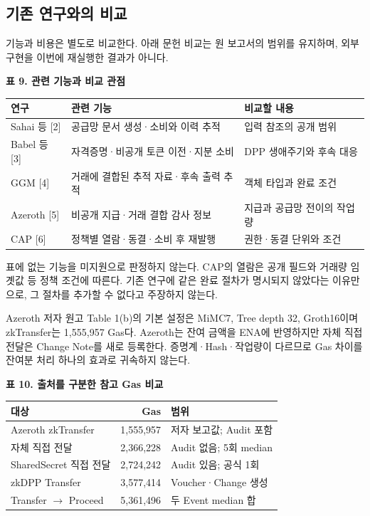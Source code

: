 \subsection{기존 연구와의 비교}
기능과 비용은 별도로 비교한다. 아래 문헌 비교는 원 보고서의 범위를 유지하며, 외부 구현을 이번에 재실행한 결과가 아니다.
\begin{center}\small\setlength{\tabcolsep}{6pt}
    \textbf{표 9. 관련 기능과 비교 관점}\par\smallskip
    \begin{tabular}{@{}p{2.1cm}p{6.2cm}p{5.3cm}@{}}\toprule
        \textbf{연구} & \textbf{관련 기능}         & \textbf{비교할 내용} \\ \midrule
        Sahai 등 [2] & 공급망 문서 생성·소비와 이력 추적    & 입력 참조의 공개 범위    \\
        Babel 등 [3] & 자격증명·비공개 토큰 이전·지분 소비   & DPP 생애주기와 후속 대응 \\
        GGM [4]     & 거래에 결합된 추적 자료·후속 출력 추적 & 객체 타입과 완료 조건    \\
        Azeroth [5] & 비공개 지급·거래 결합 감사 정보     & 지급과 공급망 전이의 작업량 \\
        CAP [6]     & 정책별 열람·동결·소비 후 재발행     & 권한·동결 단위와 조건    \\
        \bottomrule\end{tabular}\end{center}

표에 없는 기능을 미지원으로 판정하지 않는다. CAP의 열람은 공개 필드와 거래량 임곗값 등 정책 조건에 따른다.
기존 연구에 같은 완료 절차가 명시되지 않았다는 이유만으로, 그 절차를 추가할 수 없다고 주장하지 않는다.

Azeroth 저자 원고 Table 1(b)의 기본 설정은 MiMC7, Tree depth 32, Groth16이며 zkTransfer는 1,555,957 Gas다.
Azeroth는 잔여 금액을 ENA에 반영하지만 자체 직접 전달은 Change Note를 새로 등록한다.
증명계·Hash·작업량이 다르므로 Gas 차이를 잔여분 처리 하나의 효과로 귀속하지 않는다.
\begin{center}\small\setlength{\tabcolsep}{6pt}
    \textbf{표 10. 출처를 구분한 참고 Gas 비교}\par\smallskip
    \begin{tabular}{@{}lrl@{}}\toprule
        \textbf{대상}            & \textbf{Gas} & \textbf{범위}         \\ \midrule
        Azeroth zkTransfer     & 1,555,957    & 저자 보고값; Audit 포함    \\
        자체 직접 전달               & 2,366,228    & Audit 없음; 5회 median \\
        SharedSecret 직접 전달     & 2,724,242    & Audit 있음; 공식 1회     \\
        zkDPP Transfer         & 3,577,414    & Voucher·Change 생성   \\
        Transfer $\to$ Proceed & 5,361,496    & 두 Event median 합    \\
        \bottomrule\end{tabular}\end{center}

